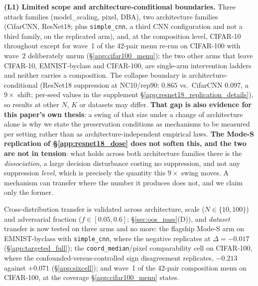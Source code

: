 \documentclass{article}
\begin{document}
\textbf{(L1) Limited scope and architecture-conditional boundaries.} Three attack families (model\_scaling, pixel, DBA), two architecture families (CifarCNN, ResNet18; plus \texttt{simple\_cnn}, a third CNN configuration and not a third family, on the replicated arm), and, at the composition level, CIFAR-10 throughout except for wave~1 of the 42-pair menu re-run on CIFAR-100 with wave~2 deliberately unrun (§\ref{app:cifar100_menu}); the two other arms that leave CIFAR-10, EMNIST-byclass and CIFAR-100, are single-arm intervention ladders and neither carries a composition. The collapse boundary is architecture-conditional (ResNet18 suppression at NC10/rep90: $0.865$ vs.\ CifarCNN $0.097$, a $9\times$ shift; per-seed values in the supplement §\ref{app:resnet18_replication_details}), so results at other $N$, $K$ or datasets may differ. \textbf{That gap is also evidence for this paper's own thesis}: a swing of that size under a change of architecture alone is why we state the preservation conditions as mechanisms to be measured per setting rather than as architecture-independent empirical laws. \textbf{The Mode-S replication of §\ref{app:resnet18_dose} does not soften this, and the two are not in tension}: what holds across both architecture families there is the \emph{dissociation}, a large decision disturbance costing no suppression, and not any suppression \emph{level}, which is precisely the quantity this $9\times$ swing moves. A mechanism can transfer where the number it produces does not, and we claim only the former.

\noindent Cross-distribution transfer is validated across architecture, scale ($N \in \{10,100\}$) and adversarial fraction ($f \in [0.05,0.6]$; §\ref{sec:oos_pass}(D)), and \emph{dataset} transfer is now tested on three arms and no more: the flagship Mode-S arm on EMNIST-byclass with \texttt{simple\_cnn}, where the negative replicates at $\Delta = -0.017$ (§\ref{app:targeted_full}); the \texttt{coord\_median}/pixel comparability cell on CIFAR-100, where the confounded-versus-controlled sign disagreement replicates, $-0.213$ against $+0.071$ (§\ref{app:sixcell}); and wave~1 of the 42-pair composition menu on CIFAR-100, at the coverage §\ref{app:cifar100_menu} states.
\end{document}
